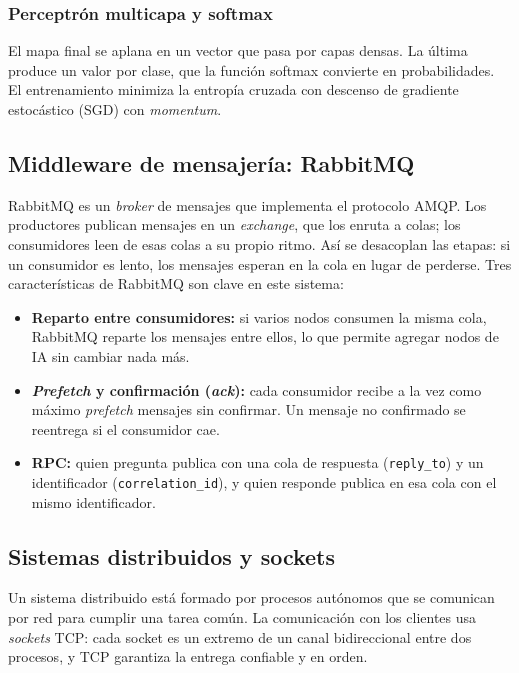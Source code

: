 \documentclass[10pt,a4paper]{article}
\begin{document}
\subsubsection{Perceptrón multicapa y softmax}

El mapa final se aplana en un vector que pasa por capas densas. La última produce un valor por clase,
que la función softmax convierte en probabilidades. El entrenamiento minimiza la entropía cruzada con
descenso de gradiente estocástico (SGD) con \textit{momentum}.

\subsection{Middleware de mensajería: RabbitMQ}

RabbitMQ es un \textit{broker} de mensajes que implementa el protocolo AMQP. Los productores publican
mensajes en un \textit{exchange}, que los enruta a colas; los consumidores leen de esas colas a su
propio ritmo. Así se desacoplan las etapas: si un consumidor es lento, los mensajes esperan en la cola
en lugar de perderse. Tres características de RabbitMQ son clave en este sistema:
\begin{itemize}
    \item \textbf{Reparto entre consumidores:} si varios nodos consumen la misma cola, RabbitMQ reparte
    los mensajes entre ellos, lo que permite agregar nodos de IA sin cambiar nada más.
    \item \textbf{\textit{Prefetch} y confirmación (\textit{ack}):} cada consumidor recibe a la vez
    como máximo \textit{prefetch} mensajes sin confirmar. Un mensaje no confirmado se reentrega si el
    consumidor cae.
    \item \textbf{RPC:} quien pregunta publica con una cola de respuesta (\texttt{reply\_to}) y un
    identificador (\texttt{correlation\_id}), y quien responde publica en esa cola con el mismo
    identificador.
\end{itemize}

\subsection{Sistemas distribuidos y sockets}

Un sistema distribuido está formado por procesos autónomos que se comunican por red para cumplir una
tarea común. La comunicación con los clientes usa \textit{sockets} TCP: cada socket es un extremo de un
canal bidireccional entre dos procesos, y TCP garantiza la entrega confiable y en orden.
\end{document}
